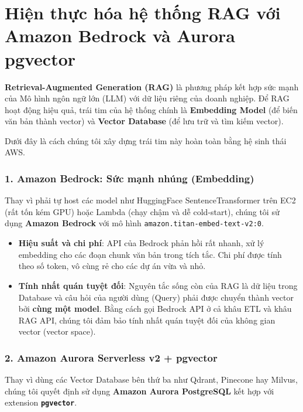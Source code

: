 \hypertarget{hiux1ec7n-thux1ef1c-huxf3a-hux1ec7-thux1ed1ng-rag-vux1edbi-amazon-bedrock-vuxe0-aurora-pgvector}{%
\section{Hiện thực hóa hệ thống RAG với Amazon Bedrock và Aurora
pgvector}}

\textbf{Retrieval-Augmented Generation (RAG)} là phương pháp kết hợp sức
mạnh của Mô hình ngôn ngữ lớn (LLM) với dữ liệu riêng của doanh nghiệp.
Để RAG hoạt động hiệu quả, trái tim của hệ thống chính là
\textbf{Embedding Model} (để biến văn bản thành vector) và
\textbf{Vector Database} (để lưu trữ và tìm kiếm vector).

Dưới đây là cách chúng tôi xây dựng trái tim này hoàn toàn bằng hệ sinh
thái AWS.

\hypertarget{amazon-bedrock-sux1ee9c-mux1ea1nh-nhuxfang-embedding}{%
\subsubsection{1. Amazon Bedrock: Sức mạnh nhúng
(Embedding)}}

Thay vì phải tự host các model như HuggingFace SentenceTransformer trên
EC2 (rất tốn kém GPU) hoặc Lambda (chạy chậm và dễ cold-start), chúng
tôi sử dụng \textbf{Amazon Bedrock} với mô hình
\texttt{amazon.titan-embed-text-v2:0}.

\begin{itemize}
\tightlist
\item
  \textbf{Hiệu suất và chi phí}: API của Bedrock phản hồi rất nhanh, xử
  lý embedding cho các đoạn chunk văn bản trong tích tắc. Chi phí được
  tính theo số token, vô cùng rẻ cho các dự án vừa và nhỏ.
\item
  \textbf{Tính nhất quán tuyệt đối}: Nguyên tắc sống còn của RAG là dữ
  liệu trong Database và câu hỏi của người dùng (Query) phải được chuyển
  thành vector bởi \textbf{cùng một model}. Bằng cách gọi Bedrock API ở
  cả khâu ETL và khâu RAG API, chúng tôi đảm bảo tính nhất quán tuyệt
  đối của không gian vector (vector space).
\end{itemize}

\hypertarget{amazon-aurora-serverless-v2-pgvector}{%
\subsubsection{2. Amazon Aurora Serverless v2 +
pgvector}}

Thay vì dùng các Vector Database bên thứ ba như Qdrant, Pinecone hay
Milvus, chúng tôi quyết định sử dụng \textbf{Amazon Aurora PostgreSQL}
kết hợp với extension \textbf{\texttt{pgvector}}.

